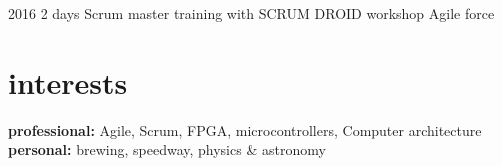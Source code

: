 \documentclass[]{cv-style}          %
\begin{document}
\begin{entrylist}
\entry
{2016}
{2 days Scrum master training with SCRUM DROID workshop}
{Agile force}
{\vspace{-0.3cm}}
\end{entrylist}


\section{interests}
  \vspace{-0.2cm}

\textbf{professional:} Agile, Scrum, FPGA, microcontrollers, Computer architecture \\  
\textbf{personal:} brewing, speedway, physics \& astronomy 

\end{document}
